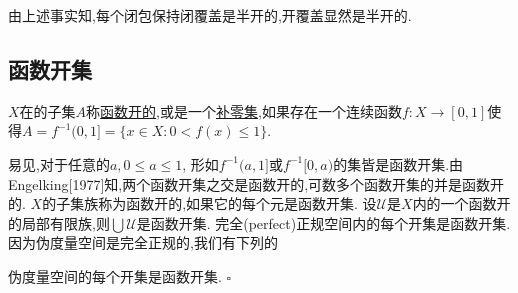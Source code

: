 \documentclass[main.tex]{subfiles}
\begin{document}
由上述事实知,每个闭包保持闭覆盖是半开的,开覆盖显然是半开的.


\subsection{函数开集}\label{ch1.1.4}
\begin{definition}
	$X$在的子集$A$称\underline{函数开的},或是一个\underline{补零集},如果存在一个连续函数$f:X\rightarrow [0,1]$使得$A=f^{-1}(0,1]=\{x\in X: 0<f(x)\le 1\}$.
\end{definition}

易见,对于任意的$a, 0\le a\le1$, 形如$f^{-1}(a,1]$或$f^{-1}[0,a)$的集皆是函数开集.由 Engelking[1977]知,两个函数开集之交是函数开的,可数多个函数开集的并是函数开的.
$X$的子集族称为函数开的,如果它的每个元是函数开集.
设$\mathscr{U}$是$X$内的一个函数开的局部有限族,则$\bigcup \mathscr{U}$是函数开集.
完全(perfect)正规空间内的每个开集是函数开集.因为伪度量空间是完全正规的,我们有下列的

\begin{fact}
伪度量空间的每个开集是函数开集. $\square$
\end{fact}
\end{document}
